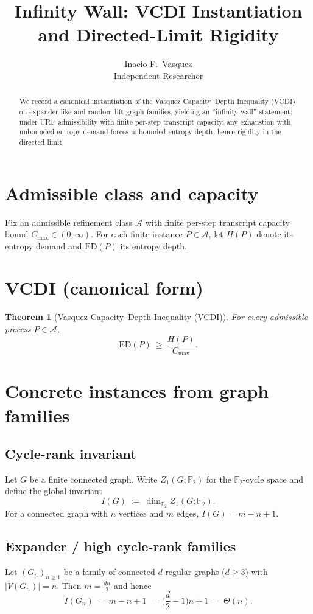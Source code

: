 \documentclass[11pt]{article}
\title{\textbf{Infinity Wall: VCDI Instantiation and Directed-Limit Rigidity}}
\author{Inacio F.\ Vasquez \\ Independent Researcher}
\date{}
\newtheorem{theorem}{Theorem}
\theoremstyle{definition}
\theoremstyle{remark}
\newcommand{\ED}{\mathrm{ED}}
\newcommand{\F}{\mathbb{F}}
\begin{document}
\maketitle

\begin{abstract}
We record a canonical instantiation of the Vasquez Capacity--Depth Inequality (VCDI) on expander-like and random-lift graph families, yielding an ``infinity wall'' statement: under URF admissibility with finite per-step transcript capacity, any exhaustion with unbounded entropy demand forces unbounded entropy depth, hence rigidity in the directed limit.
\end{abstract}

\section{Admissible class and capacity}
Fix an admissible refinement class \(\mathcal{A}\) with finite per-step transcript capacity bound \(C_{\max}\in(0,\infty)\).
For each finite instance \(P\in\mathcal{A}\), let \(H(P)\) denote its entropy demand and \(\ED(P)\) its entropy depth.

\section{VCDI (canonical form)}
\begin{theorem}[Vasquez Capacity--Depth Inequality (VCDI)]
\label{thm:vcdi}
For every admissible process \(P\in\mathcal{A}\),
\[
\ED(P)\ \ge\ \frac{H(P)}{C_{\max}}.
\]
\end{theorem}

\section{Concrete instances from graph families}

\subsection{Cycle-rank invariant}
Let \(G\) be a finite connected graph. Write \(Z_1(G;\F_2)\) for the \(\F_2\)-cycle space and define the global invariant
\[
I(G)\ :=\ \dim_{\F_2} Z_1(G;\F_2).
\]
For a connected graph with \(n\) vertices and \(m\) edges, \(I(G)=m-n+1\).

\subsection{Expander / high cycle-rank families}
Let \((G_n)_{n\ge 1}\) be a family of connected \(d\)-regular graphs (\(d\ge 3\)) with \(|V(G_n)|=n\).
Then \(m=\tfrac{dn}{2}\) and hence
\[
I(G_n)\ =\ m-n+1\ =\ \Big(\frac d2-1\Big)n+1\ =\ \Theta(n).
\]
\end{document}
